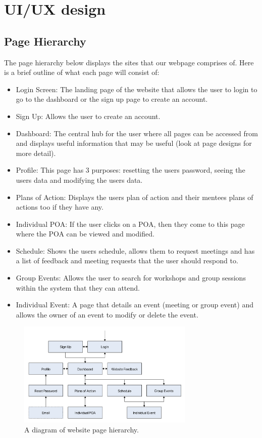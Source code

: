\documentclass[10pt]{article}
\begin{document}
\section{UI/UX design}

\subsection{Page Hierarchy}
The page hierarchy below displays the sites that our webpage comprises of. Here
is a brief outline of what each page will consist of:
\begin{itemize}
    \item Login Screen: The landing page of the website that allows the user to
    login to go to the dashboard or the sign up page to create an account.
    \item Sign Up: Allows the user to create an account.
    \item Dashboard: The central hub for the user where all pages can be
    accessed from and displays useful information that may be useful (look at
    page designs for more detail).
    \item Profile: This page has 3 purposes: resetting the users password,
    seeing the users data and modifying the users data.
    \item Plans of Action: Displays the users plan of action and their mentees
    plans of actions too if they have any.
    \item Individual POA: If the user clicks on a POA, then they come to this
    page where the POA can be viewed and modified.
    \item Schedule: Shows the users schedule, allows them to request meetings
    and has a list of feedback and meeting requests that the user should respond
    to.
    \item Group Events: Allows the user to search for workshops and group
    sessions within the system that they can attend.
    \item Individual Event: A page that details an event (meeting or group
    event) and allows the owner of an event to modify or delete the event.
\end{itemize}

\begin{figure}[H]
    \centering
    \includegraphics[width=0.75\textwidth]{Hierarchy}
    \caption{A diagram of website page hierarchy.}
    \label{fig:website_page_hierarchy}
\end{figure}
\end{document}
